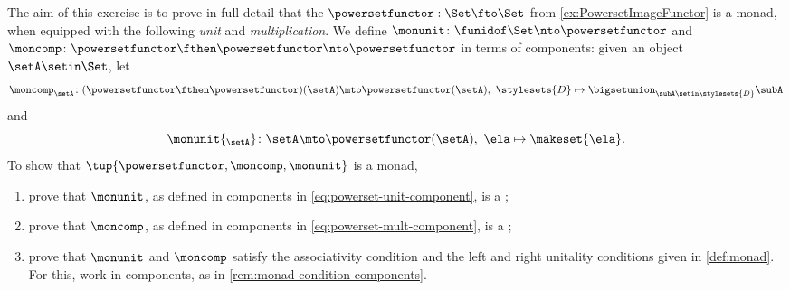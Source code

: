 \begin{gradedexercise}
    \label{ex:PowersetMonad}
    The aim of this exercise is to prove in full detail that the   $\powersetfunctor : \Set \fto \Set$ from \cref{ex:PowersetImageFunctor} is a monad, when equipped with the following \emph{unit} and \emph{multiplication}.
    We define $\monunit \colon \funidof\Set \nto \powersetfunctor$ and $\moncomp \colon \powersetfunctor \fthen \powersetfunctor \nto \powersetfunctor$ in terms of components: given an object $\setA \setin \Set$, let
    \begin{equation}
        \label{eq:powerset-mult-component}
        \moncomp_{\setA} \colon (\powersetfunctor \fthen \powersetfunctor)(\setA) \mto \powersetfunctor(\setA), \ \stylesets{D} \mapsto \bigsetunion_{\subA \setin \stylesets{D}} \subA
    \end{equation}
    and
    \begin{equation}
        \label{eq:powerset-unit-component}
        \monunit{_\setA} \colon \setA \mto \powersetfunctor(\setA), \ \ela \mapsto \makeset{ \ela }.
    \end{equation}
    To show that $\tup{\powersetfunctor, \moncomp, \monunit}$ is a monad,
    \begin{enumerate}
        \item prove that $\monunit$, as defined in components in \cref{eq:powerset-unit-component}, is a ;
        \item prove that $\moncomp$, as defined in components in \cref{eq:powerset-mult-component}, is a ;
        \item prove that $\monunit$ and $\moncomp$ satisfy the associativity condition and the left and right unitality conditions given in \cref{def:monad}.
              For this, work in components, as in \cref{rem:monad-condition-components}.
    \end{enumerate}
\end{gradedexercise}


